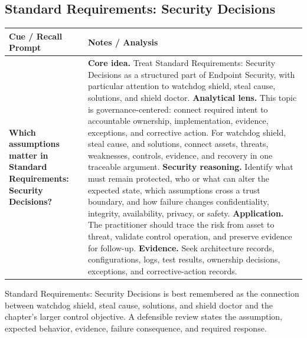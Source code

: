 \documentclass[11pt]{article}
\newcommand{\CornellHeader}{%
\rowcolor{Navy}\color{white}\bfseries Cue / Recall Prompt & \color{white}\bfseries Notes / Analysis\\\hline}
\newcommand{\CornellRow}[2]{%
\cellcolor{CueGray}\RaggedRight\textbf{#1} & \RaggedRight #2\\\hline}
\begin{document}
\subsection*{Standard Requirements: Security Decisions}
\begin{longtable}{>{\RaggedRight\arraybackslash}p{}|>{\RaggedRight\arraybackslash}p{}}
\CornellHeader
\CornellRow{Which assumptions matter in Standard Requirements: Security Decisions?}{\textbf{Core idea.} Treat Standard Requirements: Security Decisions as a structured part of Endpoint Security, with particular attention to watchdog shield, steal cause, solutions, and shield doctor. \textbf{Analytical lens.} This topic is governance-centered: connect required intent to accountable ownership, implementation, evidence, exceptions, and corrective action. For watchdog shield, steal cause, and solutions, connect assets, threats, weaknesses, controls, evidence, and recovery in one traceable argument. \textbf{Security reasoning.} Identify what must remain protected, who or what can alter the expected state, which assumptions cross a trust boundary, and how failure changes confidentiality, integrity, availability, privacy, or safety. \textbf{Application.} The practitioner should trace the risk from asset to threat, validate control operation, and preserve evidence for follow-up. \textbf{Evidence.} Seek architecture records, configurations, logs, test results, ownership decisions, exceptions, and corrective-action records.}
\end{longtable}
\begin{topicsummary}
Standard Requirements: Security Decisions is best remembered as the connection between watchdog shield, steal cause, solutions, and shield doctor and the chapter's larger control objective. A defensible review states the assumption, expected behavior, evidence, failure consequence, and required response.
\end{topicsummary}
\end{document}
